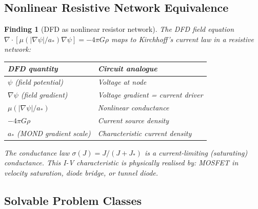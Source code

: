 \documentclass[11pt]{article}
\newtheorem{finding}[theorem]{Finding}
\theoremstyle{definition}
\theoremstyle{remark}
\begin{document}
\subsection{Nonlinear Resistive Network Equivalence}

\begin{finding}[DFD as nonlinear resistor network]
\label{find:resistive}
The DFD field equation
$\nabla \cdot [\mu(|\nabla\psi|/a_*)\nabla\psi] = -4\pi G\rho$
maps to Kirchhoff's current law in a resistive network:
\begin{center}
\begin{tabular}{@{}ll@{}}
\toprule
\textbf{DFD quantity} & \textbf{Circuit analogue} \\
\midrule
$\psi$ (field potential) & Voltage at node \\
$\nabla\psi$ (field gradient) & Voltage gradient = current driver \\
$\mu(|\nabla\psi|/a_*)$ & Nonlinear conductance \\
$-4\pi G\rho$ & Current source density \\
$a_*$ (MOND gradient scale) & Characteristic current density \\
\bottomrule
\end{tabular}
\end{center}

The conductance law $\sigma(J) = J/(J+J_*)$ is a current-limiting
(saturating) conductance. This I-V characteristic is physically realised
by: MOSFET in velocity saturation, diode bridge, or tunnel diode.
\end{finding}

\subsection{Solvable Problem Classes}
\end{document}
